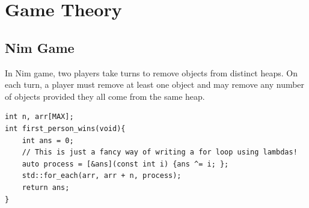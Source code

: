 \documentclass[12pt]{book}
\begin{document}
\chapter{Game Theory}
\section{Nim Game}
In Nim game, two players take turns to remove objects from distinct heaps. On each turn, a player must remove at least one object and may remove any number of objects provided they all come from the same heap.
\begin{verbatim}
int n, arr[MAX];
int first_person_wins(void){
	int ans = 0;
	// This is just a fancy way of writing a for loop using lambdas!
	auto process = [&ans](const int i) {ans ^= i; };
	std::for_each(arr, arr + n, process);
	return ans;
}
\end{verbatim}
\end{document}
